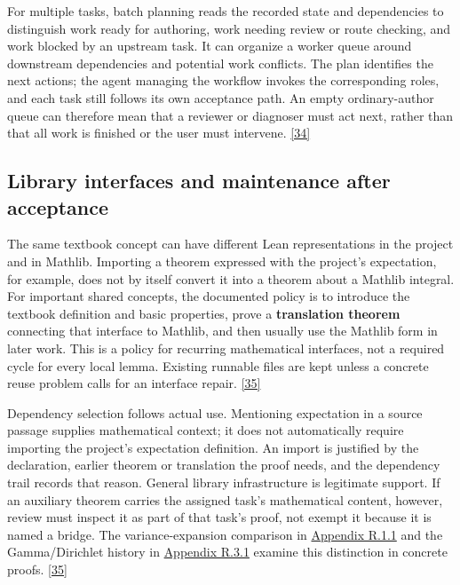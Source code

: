 For multiple tasks, batch planning reads the recorded state and dependencies to distinguish work ready for authoring, work needing review or route checking, and work blocked by an upstream task. It can organize a worker queue around downstream dependencies and potential work conflicts. The plan identifies the next actions; the agent managing the workflow invokes the corresponding roles, and each task still follows its own acceptance path. An empty ordinary-author queue can therefore mean that a reviewer or diagnoser must act next, rather than that all work is finished or the user must intervene. \hyperlink{ref-34}{\mbox{[34]}}

\subsection[Library interfaces and maintenance after acceptance]{\texorpdfstring{\protect\hypertarget{section-1-5}{}Library interfaces and maintenance after acceptance}{Library interfaces and maintenance after acceptance}}
The same textbook concept can have different Lean representations in the project and in Mathlib. Importing a theorem expressed with the project's expectation, for example, does not by itself convert it into a theorem about a Mathlib integral. For important shared concepts, the documented policy is to introduce the textbook definition and basic properties, prove a \textbf{translation theorem} connecting that interface to Mathlib, and then usually use the Mathlib form in later work. This is a policy for recurring mathematical interfaces, not a required cycle for every local lemma. Existing runnable files are kept unless a concrete reuse problem calls for an interface repair. \hyperlink{ref-35}{\mbox{[35]}}

Dependency selection follows actual use. Mentioning expectation in a source passage supplies mathematical context; it does not automatically require importing the project's expectation definition. An import is justified by the declaration, earlier theorem or translation the proof needs, and the dependency trail records that reason. General library infrastructure is legitimate support. If an auxiliary theorem carries the assigned task's mathematical content, however, review must inspect it as part of that task's proof, not exempt it because it is named a bridge. The variance-expansion comparison in \href{en-appendix.pdf\#r1-1}{Appendix R.1.1} and the Gamma/Dirichlet history in \href{en-appendix.pdf\#r3-1}{Appendix R.3.1} examine this distinction in concrete proofs. \hyperlink{ref-35}{\mbox{[35]}}


